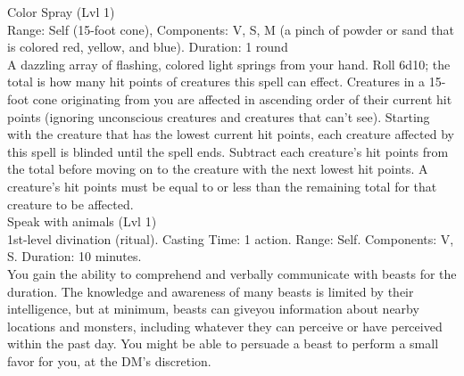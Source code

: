 \documentclass[11pt]{article}
\begin{document}
\newpage
{}
Color Spray (Lvl 1)
\\
Range: Self (15-foot cone), Components: V, S, M (a pinch of powder or sand that is colored red, yellow, and blue). Duration: 1 round
\\
A dazzling array of flashing, colored light springs from your hand. Roll 6d10; the total is how many hit points of creatures this spell can effect. Creatures in a 15-foot cone originating from you are affected in ascending order of their current hit points (ignoring unconscious creatures and creatures that can’t see). Starting with the creature that has the lowest current hit points, each creature affected by this spell is blinded until the spell ends. Subtract each creature’s hit points from the total before moving on to the creature with the next lowest hit points. A creature’s hit points must be equal to or less than the remaining total for that creature to be affected.
\\
Speak with animals (Lvl 1)
\\
1st-level divination (ritual). Casting Time: 1 action. Range: Self. Components: V, S. Duration: 10 minutes. 
\\
You gain the ability to comprehend and verbally communicate with beasts for the duration. The knowledge and awareness of many beasts is limited by their intelligence, but at minimum, beasts can giveyou information about nearby locations and monsters, including whatever they can perceive or have perceived within the past day. You might be able to persuade a beast to perform a small favor for you, at the DM’s discretion. 
\end{document}
